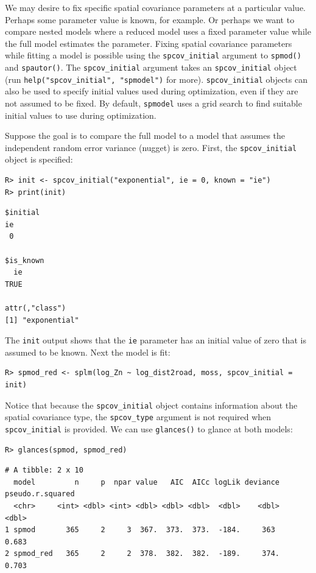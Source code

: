 \documentclass{article}
\begin{document}
We may desire to fix specific spatial covariance parameters at a
particular value. Perhaps some parameter value is known, for example. Or
perhaps we want to compare nested models where a reduced model uses a
fixed parameter value while the full model estimates the parameter.
Fixing spatial covariance parameters while fitting a model is possible
using the \texttt{spcov\_initial} argument to \texttt{spmod()} and
\texttt{spautor()}. The \texttt{spcov\_initial} argument takes an
\texttt{spcov\_initial} object (run
\texttt{help("spcov\_initial",\ "spmodel")} for more).
\texttt{spcov\_initial} objects can also be used to specify initial
values used during optimization, even if they are not assumed to be
fixed. By default, \texttt{spmodel} uses a grid search to find suitable
initial values to use during optimization.

Suppose the goal is to compare the full model to a model that assumes
the independent random error variance (nugget) is zero. First, the
\texttt{spcov\_initial} object is specified:

\begin{verbatim}
R> init <- spcov_initial("exponential", ie = 0, known = "ie")
R> print(init)
\end{verbatim}

\begin{verbatim}
$initial
ie 
 0 

$is_known
  ie 
TRUE 

attr(,"class")
[1] "exponential"
\end{verbatim}

The \texttt{init} output shows that the \texttt{ie} parameter has an
initial value of zero that is assumed to be known. Next the model is
fit:

\begin{verbatim}
R> spmod_red <- splm(log_Zn ~ log_dist2road, moss, spcov_initial = init)
\end{verbatim}

Notice that because the \texttt{spcov\_initial} object contains
information about the spatial covariance type, the \texttt{spcov\_type}
argument is not required when \texttt{spcov\_initial} is provided. We
can use \texttt{glances()} to glance at both models:

\begin{verbatim}
R> glances(spmod, spmod_red)
\end{verbatim}

\begin{verbatim}
# A tibble: 2 x 10
  model         n     p  npar value   AIC  AICc logLik deviance pseudo.r.squared
  <chr>     <int> <dbl> <int> <dbl> <dbl> <dbl>  <dbl>    <dbl>            <dbl>
1 spmod       365     2     3  367.  373.  373.  -184.     363             0.683
2 spmod_red   365     2     2  378.  382.  382.  -189.     374.            0.703
\end{verbatim}
\end{document}
